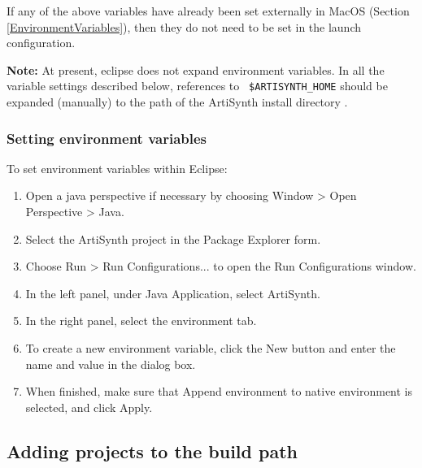 \documentclass{article}
\def\SYSTEM{MacOS }
\def\directory{directory }
\begin{document}
If any of the above variables have already been set externally in
\SYSTEM (Section \ref{EnvironmentVariables}), then they do not need to
be set in the launch configuration.

\begin{sideblock}
{\bf Note:} At present, eclipse does not expand environment variables.
In all the variable settings described below, references to {\tt
\$ARTISYNTH\_HOME} should be expanded (manually) to the path of the
ArtiSynth install \directory.
\end{sideblock}

\subsubsection {Setting environment variables}
\label{SettingEnvironmentVariables}

To set environment variables within Eclipse:

\begin{enumerate}

\item Open a java perspective if necessary by choosing
  {\sf Window > Open Perspective > Java}.

\item Select the ArtiSynth project in the {\sf Package Explorer} form.

\item Choose {\sf Run > Run Configurations...} to open the {\sf Run
  Configurations} window.

\item In the left panel, under {\sf Java Application}, select {\sf ArtiSynth}.

\item In the right panel, select the {\sf environment} tab.

\item To create a new environment variable, click the {\sf New} button and
  enter the name and value in the dialog box.

\item When finished, make sure that {\sf Append environment to native
  environment} is selected, and click {\sf Apply}.

\end{enumerate}

\subsection{Adding projects to the build path}
\label{AddingProjectsToBuildPath}
\end{document}
